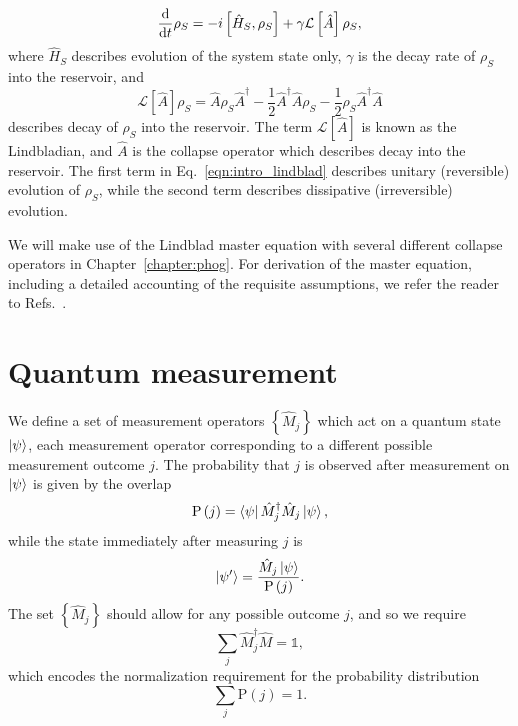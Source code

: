 \begin{equation}\label{eqn:intro_lindblad}
\frac{\mathrm{d}}{\mathrm{d}t} \rho_S = - i \left[ \hat{H}_S, \rho_S \right] + \gamma \mathcal{L}\left[\hat{A}\right] \rho_S,
\end{equation}
where $\hat{H}_S$ describes evolution of the system state only, $\gamma$ is the decay rate of $\rho_S$ into the reservoir, and 
\begin{equation}
\mathcal{L}\left[\hat{A}\right] \rho_S = \hat{A} \rho_S \hat{A}^\dagger - \frac{1}{2} \hat{A}^\dagger \hat{A} \rho_S - \frac{1}{2} \rho_S \hat{A}^\dagger \hat{A}
\end{equation}
describes decay of $\rho_S$ into the reservoir. The term $\mathcal{L}\left[\hat{A}\right]$ is known as the Lindbladian, and $\hat{A}$ is the collapse operator which describes decay into the reservoir. The first term in Eq.~\ref{eqn:intro_lindblad} describes unitary (reversible) evolution of $\rho_S$, while the second term describes dissipative (irreversible) evolution.

We will make use of the Lindblad master equation with several different collapse operators in Chapter~\ref{chapter:phog}. For derivation of the master equation, including a detailed accounting of the requisite assumptions, we refer the reader to Refs.~\cite{Breuer2002, Carmichael1999}.



\FloatBarrier
\section{Quantum measurement}
We define a set of measurement operators $\left\{\hat{M}_j\right\}$ which act on a quantum state $\ket{\psi}$, each measurement operator corresponding to a different possible measurement outcome $j$. The probability that $j$ is observed after measurement on $\ket{\psi}$ is given by the overlap
\begin{equation}
\text{P}\left(j\right) = \bra{\psi}\hat{M}^\dagger_j \hat{M}_j\ket{\psi},
\end{equation}
while the state immediately after measuring $j$ is 
\begin{equation}
\ket{\psi^\prime} = \frac{\hat{M}_j \ket{\psi}}{\text{P}\left(j\right)}.
\end{equation}
The set $\left\{\hat{M}_j\right\}$ should allow for any possible outcome $j$, and so we require
\begin{equation}
\sum_j \hat{M}_j^\dagger \hat{M} = \mathds{1},
\end{equation}
which encodes the normalization requirement for the probability distribution
\begin{equation}
\sum_j \text{P}\left(j\right) = 1.
\end{equation}

